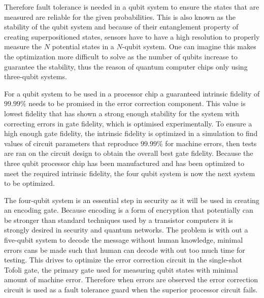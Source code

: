 Therefore fault tolerance is needed in a qubit system to ensure the states that are measured are reliable for the given probabilities. This is also known as the stability of the qubit system and because of their entanglement property of creating superpositioned states, sensors have to have a high resolution to properly measure the $N$ potential states in a $N$-qubit system. One can imagine this makes the optimization more difficult to solve as the number of qubits increase to guarantee
the stability, thus the reason of quantum computer chips only using three-qubit systems. 

For a qubit system to be used in a processor chip a guaranteed intrinsic fidelity of $99.99\%$ needs to be promised in the error correction component. This value is lowest fidelity that has shown a strong enough stability for the system with correcting errors in gate fidelity, which is optimised experimentally. To ensure a high enough gate fidelity, the intrinsic fidelity is optimized in a simulation to find values of circuit parameters that reproduce $99.99\%$ for machine errors, then
tests are ran on the circuit design to obtain the overall best gate fidelity. Because the three qubit processor chip has been manufactured and has been optimized to meet the required intrinsic fidelity, the four qubit system is now the next system to be optimized. 

The four-qubit system is an essential step in security as it will be used in creating an encoding gate. Because encoding is a form of encryption that potentially can be stronger than standard techniques used by a transistor computers it is strongly desired in security and quantum networks. The problem is with out a five-qubit system to decode the message without human knowledge, minimal errors cans be made such that human can decode with out too much time for testing. This drives to
optimize the error correction circuit in the single-shot Tofoli gate, the primary gate used for measuring qubit states with minimal amount of machine error. Therefore when errors are observed the error correction circuit is used as a fault tolerance guard when the superior processor circuit fails.     

